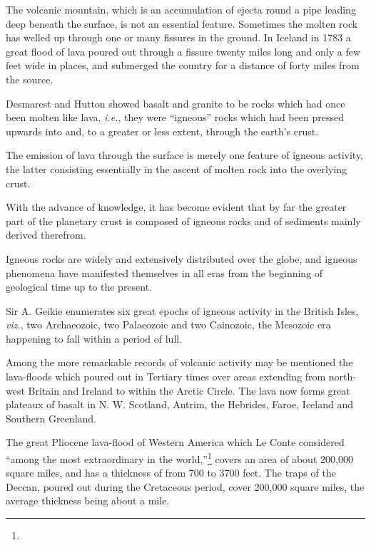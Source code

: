 \documentclass[a4paper, 12pt, oneside]{article}
\begin{document}
The volcanic mountain, which is an accumulation of ejecta round a pipe leading deep beneath the surface, is not an essential feature. Sometimes the molten rock has welled up through one or many fissures in the ground. In Iceland in 1783 a great flood of lava poured out through a fissure twenty miles long and only a few feet wide in places, and submerged the country for a distance of forty miles from the source.

Desmarest and Hutton showed basalt and granite to be rocks which had once been molten like lava, \emph{i.e.}, they were ``igneous'' rocks which had been pressed upwards into and, to a greater or less extent, through the earth's crust.

The emission of lava through the surface is merely one feature of igneous activity, the latter consisting essentially in the ascent of molten rock into the overlying crust.

With the advance of knowledge, it has become evident that by far the greater part of the planetary crust is composed of igneous rocks and of sediments mainly derived therefrom.

Igneous rocks are widely and extensively distributed over the globe, and igneous phenomena have manifested themselves in all eras from the beginning of geological time up to the present.

Sir A. Geikie enumerates six great epochs of igneous activity in the British Isles, \emph{viz.}, two Archaeozoic, two Palaeozoic and two Cainozoic, the Mesozoic era happening to fall within a period of lull.

Among the more remarkable records of volcanic activity may be mentioned the lava-floods which poured out in Tertiary times over areas extending from north-west Britain and Ireland to within the Arctic Circle. The lava now forms great plateaux of basalt in N. W. Scotland, Antrim, the Hebrides, Faroe, Iceland and Southern Greenland.

The great Pliocene lava-flood of Western America which Le Conte considered ``among the most extraordinary in the world,''\footnote{} covers an area of about 200,000 square miles, and has a thickness of from 700 to 3700 feet. The traps of the Deccan, poured out during the Cretaceous period, cover 200,000 square miles, the average thickness being about a mile.
\end{document}
